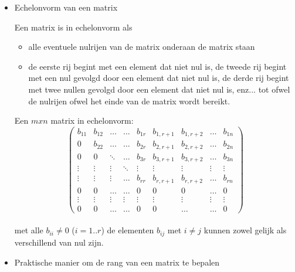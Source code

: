 \begin{itemize}

\item{Echelonvorm van een matrix}

\begin{framed}

Een matrix is in echelonvorm als
\begin{itemize}
	\item alle eventuele nulrijen van de matrix onderaan de matrix staan
	\item de eerste rij begint met een element dat niet nul is, de tweede rij begint met een nul gevolgd door een element dat niet nul is, de derde rij begint met twee nullen gevolgd door een element dat niet nul is, enz... tot ofwel de nulrijen ofwel het einde van de matrix wordt bereikt.
\end{itemize}

Een $mxn$ matrix in echelonvorm:\\

\[ \left( \begin{matrix}
b_{11} & b_{12} & \ldots & \ldots & b_{1r} & b_{1,r+1} & b_{1,r+2} & \ldots & b_{1n} \\
0 & b_{22} & \ldots & \ldots & b_{2r} & b_{2,r+1} & b_{2,r+2} & \ldots & b_{2n} \\
0 & 0 & \ddots & \ldots & b_{3r} & b_{3,r+1} & b_{3,r+2} & \ldots & b_{3n} \\
\vdots & \vdots & \vdots & \ddots & \vdots & \vdots & \vdots & \vdots & \vdots \\
\vdots & \vdots & \vdots & \ldots & b_{rr} & b_{r,r+1} & b_{r,r+2} & \ldots & b_{rn} \\
0 & 0 & \ldots & \ldots & 0 & 0 & 0 & \ldots & 0\\
\vdots & \vdots & \vdots & \vdots & \vdots & \vdots & \vdots & \vdots & \vdots \\
0 & 0 & \ldots & \ldots & 0 & 0 & \ldots & \ldots & 0
\end{matrix} \right)  \] \\

met alle $b_{ii} \neq 0$ ($i=1..r$) de elementen $b_{ij}$ met $i \neq j$ kunnen zowel gelijk als verschillend van nul zijn.\\

\end{framed}



\item{Praktische manier om de rang van een matrix te bepalen}


\end{itemize}
